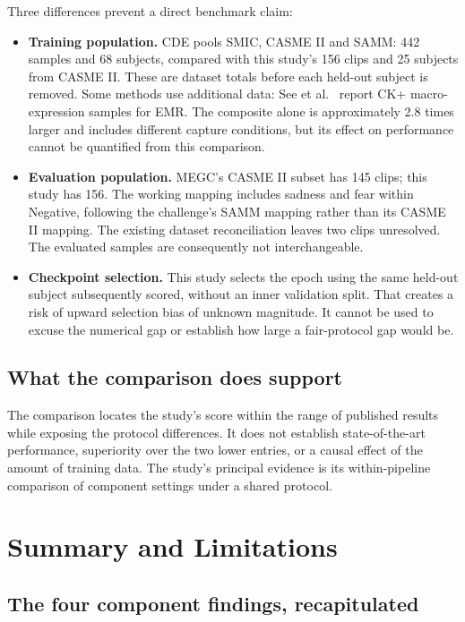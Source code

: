 Three differences prevent a direct benchmark claim:

\begin{itemize}
    \item \textbf{Training population.} CDE pools SMIC, CASME II and SAMM: 442 samples and 68 subjects, compared with this study's 156 clips and 25 subjects from CASME II. These are dataset totals before each held-out subject is removed. Some methods use additional data: See et al.~\cite{see2019} report CK+ macro-expression samples for EMR. The composite alone is approximately 2.8 times larger and includes different capture conditions, but its effect on performance cannot be quantified from this comparison.
    \item \textbf{Evaluation population.} MEGC's CASME II subset has 145 clips; this study has 156. The working mapping includes sadness and fear within Negative, following the challenge's SAMM mapping rather than its CASME II mapping. The existing dataset reconciliation leaves two clips unresolved. The evaluated samples are consequently not interchangeable.
    \item \textbf{Checkpoint selection.} This study selects the epoch using the same held-out subject subsequently scored, without an inner validation split. That creates a risk of upward selection bias of unknown magnitude. It cannot be used to excuse the numerical gap or establish how large a fair-protocol gap would be.
\end{itemize}

\subsection{What the comparison does support}
\label{sec:comparison-supports}

The comparison locates the study's score within the range of published results while exposing the protocol differences. It does not establish state-of-the-art performance, superiority over the two lower entries, or a causal effect of the amount of training data. The study's principal evidence is its within-pipeline comparison of component settings under a shared protocol.

\section{Summary and Limitations}
\label{sec:summary-limitations}

\subsection{The four component findings, recapitulated}
\label{sec:four-findings}

